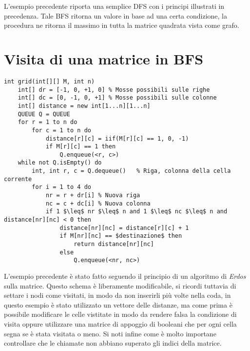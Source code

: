 \documentclass[../cheatSheetAlgoritmi.tex]{subfiles}
\begin{document}
L'esempio precedente riporta una semplice DFS con i principi illustrati in precedenza. Tale BFS ritorna un valore in base ad una certa condizione, la procedura ne ritorna il massimo in tutta la matrice quadrata vista come grafo.
 
\section{Visita di una matrice in BFS}
\begin{lstlisting}[caption=Schema BFS con Matrice quadra]
int grid(int[][] M, int n)
	int[] dr = [-1, 0, +1, 0] % Mosse possibili sulle righe
  	int[] dc = [0, -1, 0, +1] % Mosse possibili sulle colonne
  	int[] distance = new int[1...n][1...n]
  	QUEUE Q = QUEUE
  	for r = 1 to n do
    	for c = 1 to n do
      		distance[r][c] = iif(M[r][c] == 1, 0, -1)
      		if M[r][c] == 1 then
        		Q.enqueue(<r, c>)
  	while not Q.isEmpty() do
    	int, int r, c = Q.dequeue()   % Riga, colonna della cella corrente
    	for i = 1 to 4 do
      		nr = r + dr[i] % Nuova riga
      		nc = c + dc[i] % Nuova colonna
      		if 1 $\leq$ nr $\leq$ n and 1 $\leq$ nc $\leq$ n and distance[nr][nc] < 0 then
        		distance[nr][nc] = distance[r][c] + 1
        		if M[nr][nc] == $destinazione$ then
          			return distance[nr][nc]
        		else
          			Q.enqueue(<nr, nc>)
\end{lstlisting}
L'esempio precedente è stato fatto seguendo il principio di un algoritmo di \textit{Erdos} sulla matrice. Questo schema è liberamente modificabile, si ricordi tuttavia di settare i nodi come visitati, in modo da non inserirli più volte nella coda, in questo esempio è stato utilizzato un vettore delle distanze, ma come prima è possibile modificare le celle vistitate in modo da rendere falsa la condizione di visita oppure utilizzare una matrice di appoggio di booleani che per ogni cella segna se è stata visitata o meno. Si noti infine come è molto importane controllare che le chiamate non abbiano superato gli indici della matrice.

 
\end{document}
